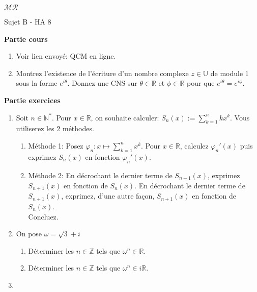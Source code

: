 \documentclass[a4paper,11pt, landscape]{article}
\begin{document}
\begin{multicols*}{3}
\begin{enumerate}[leftmargin=*]
\end{enumerate}
\centerline{$\mathcal{MR}$}

\vfill\null
\columnbreak
\centerline{Sujet B - HA 8}

\begin{flushleft}
  \textbf{Partie cours} 
\end{flushleft} 
\begin{enumerate}[leftmargin=*]
  \item Voir lien envoyé: QCM en ligne.
  \item Montrez l'existence de l'écriture d'un nombre complexe $z \in \mathbb{U}$ de module 1 sous la forme $e^{i\theta}$. Donnez une CNS sur $\theta \in \mathbb{R}$ et $\phi \in \mathbb{R}$ pour que $e^{i\theta} = e^{i\phi}$.
\end{enumerate}
\textbf{Partie exercices}
\begin{enumerate}[leftmargin=*]
  \item Soit $n \in \mathbb{N}^*$. Pour $x \in \mathbb{R}$, on souhaite calculer: $S_n(x) := \sum\limits_{k=1}^{n}kx^k$. Vous utiliserez les 2 méthodes.
  \begin{enumerate}
    \item Méthode 1: Posez $\varphi_n : x \mapsto \sum\limits_{k=1}^{n}x^k$. Pour $x \in \mathbb{R}$, calculez $\varphi_n'(x)$ puis exprimez $S_n(x)$ en fonction $\varphi_n'(x)$.
    \item Méthode 2: En décrochant le dernier terme de $S_{n+1}(x)$, exprimez $S_{n+1}(x)$ en fonction de $S_{n}(x)$. En décrochant le dernier terme de $S_{n+1}(x)$, exprimez, d'une autre façon, $S_{n+1}(x)$ en fonction de $S_{n}(x)$.\\
    Concluez.
  \end{enumerate}
  \item On pose $\omega = \sqrt{3}+i$
  \begin{enumerate}
    \item Déterminer les $n \in \mathbb{Z}$ tels que $\omega^n \in \mathbb{R}$.
    \item Déterminer les $n \in \mathbb{Z}$ tels que $\omega^n \in i\mathbb{R}$.
  \end{enumerate}
\item
\begin{enumerate}

\end{enumerate}
\end{enumerate}
\end{multicols*}
\end{document}
